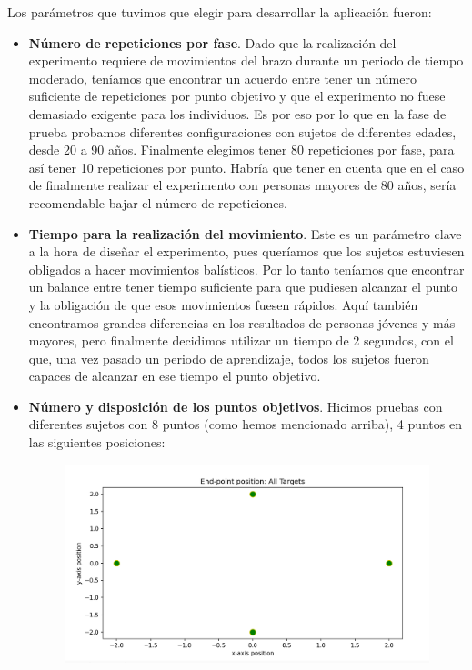 \documentclass[a4paper,11pt, oneside]{book}
\begin{document}
Los parámetros que tuvimos que elegir para desarrollar la aplicación fueron:
\begin{itemize}
	\item \textbf{Número de repeticiones por fase}. Dado que la realización del experimento requiere de movimientos del brazo durante un periodo de tiempo moderado, teníamos que encontrar un acuerdo entre tener un número suficiente de repeticiones por punto objetivo y que el experimento no fuese demasiado exigente para los individuos. Es por eso por lo que en la fase de prueba probamos diferentes configuraciones con sujetos de diferentes edades, desde 20 a 90 años. Finalmente elegimos tener 80 repeticiones por fase, para así tener 10 repeticiones por punto. Habría que tener en cuenta que en el caso de finalmente realizar el experimento con personas mayores de 80 años, sería recomendable bajar el número de repeticiones.
	\item \textbf{Tiempo para la realización del movimiento}. Este es un parámetro clave a la hora de diseñar el experimento, pues queríamos que los sujetos estuviesen obligados a hacer movimientos balísticos. Por lo tanto teníamos que encontrar un balance entre tener tiempo suficiente para que pudiesen alcanzar el punto y la obligación de que esos movimientos fuesen rápidos. Aquí también encontramos grandes diferencias en los resultados de personas jóvenes y más mayores, pero finalmente decidimos utilizar un tiempo de 2 segundos, con el que, una vez pasado un periodo de aprendizaje, todos los sujetos fueron capaces de alcanzar en ese tiempo el punto objetivo.
	\item \textbf{Número y disposición de los puntos objetivos}. Hicimos pruebas con diferentes sujetos con 8 puntos (como hemos mencionado arriba), 4 puntos en las siguientes posiciones:
	
		 \begin{figure}[H]
		
		\centering
		\includegraphics[width=0.5\linewidth]{points-4}
		
		\label{fig:figura1}
		
	\end{figure}
	

\end{itemize}
\end{document}
